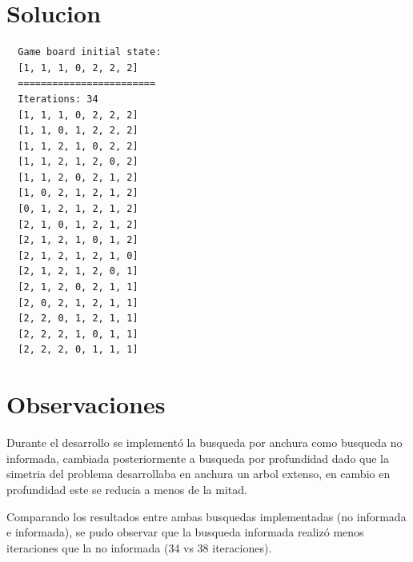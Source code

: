 \documentclass[letterpaper]{article}
\begin{document}
\section{Solucion}

\begin{lstlisting}
  Game board initial state:
  [1, 1, 1, 0, 2, 2, 2]
  ========================
  Iterations: 34
  [1, 1, 1, 0, 2, 2, 2]
  [1, 1, 0, 1, 2, 2, 2]
  [1, 1, 2, 1, 0, 2, 2]
  [1, 1, 2, 1, 2, 0, 2]
  [1, 1, 2, 0, 2, 1, 2]
  [1, 0, 2, 1, 2, 1, 2]
  [0, 1, 2, 1, 2, 1, 2]
  [2, 1, 0, 1, 2, 1, 2]
  [2, 1, 2, 1, 0, 1, 2]
  [2, 1, 2, 1, 2, 1, 0]
  [2, 1, 2, 1, 2, 0, 1]
  [2, 1, 2, 0, 2, 1, 1]
  [2, 0, 2, 1, 2, 1, 1]
  [2, 2, 0, 1, 2, 1, 1]
  [2, 2, 2, 1, 0, 1, 1]
  [2, 2, 2, 0, 1, 1, 1]
\end{lstlisting}

\section{Observaciones}

Durante el desarrollo se implementó la busqueda por anchura como busqueda no informada,
cambiada posteriormente a busqueda por profundidad dado que la simetria del problema desarrollaba en
anchura un arbol extenso, en cambio en profundidad este se reducia a menos de la mitad.

Comparando los resultados entre ambas busquedas implementadas (no informada e informada),
se pudo observar que la busqueda informada realizó menos iteraciones que la no informada (34 vs 38 iteraciones).
\end{document}

